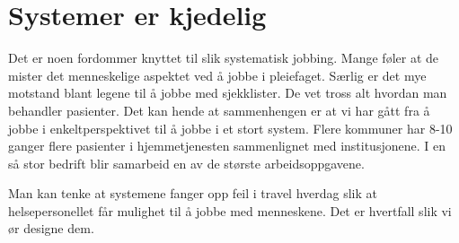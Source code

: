 		\section{Systemer er kjedelig} 
			Det er noen fordommer knyttet til slik systematisk jobbing. Mange føler at de mister det menneskelige aspektet ved å jobbe i pleiefaget. Særlig er det mye motstand blant legene til å jobbe med sjekklister. De vet tross alt hvordan man behandler pasienter\cite{FA-gawande}. Det kan hende at sammenhengen er at vi har gått fra å jobbe i enkeltperspektivet til å jobbe i et stort system. Flere kommuner har 8-10 ganger flere pasienter i hjemmetjenesten sammenlignet med institusjonene. I en så stor bedrift blir samarbeid en av de største arbeidsoppgavene.\par
			Man kan tenke at systemene fanger opp feil i travel hverdag slik at helsepersonellet får mulighet til å jobbe med menneskene. Det er hvertfall slik vi ør designe dem.
